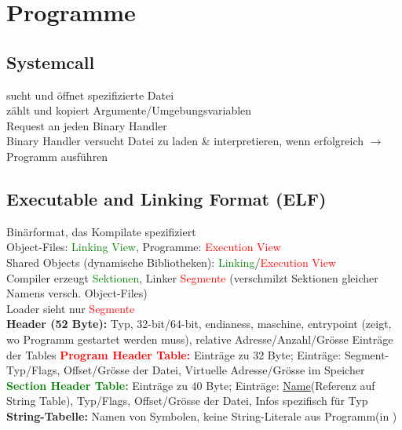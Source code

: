 \section{Programme}
\subsection{Systemcall }
sucht und öffnet spezifizierte Datei\\
zählt und kopiert Argumente/Umgebungsvariablen\\
Request an jeden Binary Handler\\
Binary Handler versucht Datei zu laden \& interpretieren, wenn erfolgreich $\rightarrow$ Programm ausführen

\subsection{Executable and Linking Format (ELF)}
Binärformat, das Kompilate spezifiziert\\
Object-Files: \textcolor{green}{Linking View}, Programme: \textcolor{red}{Execution View}\\
Shared Objects (dynamische Bibliotheken): \textcolor{green}{Linking}/\textcolor{red}{Execution View}\\
Compiler erzeugt \textcolor{green}{Sektionen}, Linker \textcolor{red}{Segmente} (verschmilzt Sektionen gleicher Namens versch. Object-Files)\\
Loader sieht nur \textcolor{red}{Segmente}\\
\textbf{Header (52 Byte):} Typ, 32-bit/64-bit, endianess, maschine, entrypoint (zeigt, wo Programm gestartet werden muss), relative Adresse/Anzahl/Grösse Einträge der Tables
\textcolor{red}{\textbf{Program Header Table:}} Einträge zu 32 Byte; Einträge: Segment-Typ/Flags, Offset/Grösse der Datei, Virtuelle Adresse/Grösse im Speicher\\
\textcolor{green}{\textbf{Section Header Table:}} Einträge zu 40 Byte; Einträge: \underline{Name}(Referenz auf String Table), Typ/Flags, Offset/Grösse der Datei, Infos spezifisch für Typ\\
\textbf{String-Tabelle:} Namen von Symbolen, keine String-Literale aus Programm(in )


